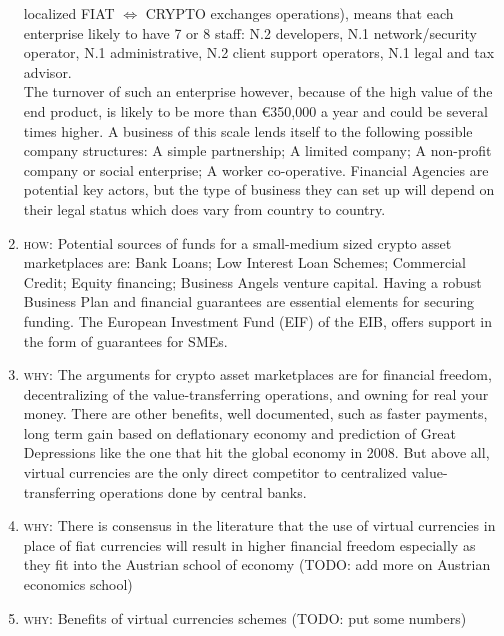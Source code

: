 \documentclass[11pt,fleqn,oneside]{book} %
\begin{document}
\begin{enumerate}
	localized FIAT $\Leftrightarrow$ CRYPTO exchanges operations), means that each enterprise likely to have 7 or 8 staff: N.2 developers, 
	N.1 network/security operator, N.1 administrative, N.2 client support operators, N.1 legal and tax advisor. \\
	The turnover of such an enterprise however, because of the high value of the end product, is likely to be more than 
	\euro 350,000 a year and could be several times higher. A business of
	this scale lends itself to the following possible company structures: A simple partnership;
	A limited company; A non-profit company or social enterprise; A worker co-operative.
	Financial Agencies are potential key actors, but the type of business they can set up will
	depend on their legal status which does vary from country to country.
	\item \textsc{how}: Potential sources of funds for a small-medium sized crypto asset marketplaces are: Bank Loans; Low
	Interest Loan Schemes; Commercial Credit; Equity financing; Business Angels venture
	capital. Having a robust Business Plan and financial guarantees are essential elements
	for securing funding. The European Investment Fund (EIF) of the EIB, offers support in
	the form of guarantees for SMEs.
	\item \textsc{why}: The arguments for crypto asset marketplaces are for financial freedom, decentralizing of the value-transferring operations, and
	owning for real your money. 
	There are other benefits, well documented, such as faster payments, long term gain based on deflationary economy and prediction of 
	Great Depressions like the one that hit the global economy in 2008. But
	above all, virtual currencies are the only direct competitor to centralized value-transferring operations done by central banks.

	\item \textsc{why}: There is consensus in the literature that the use of virtual currencies in place of fiat currencies will result in 
	higher financial freedom especially as they fit into the Austrian school of economy \cite{austrianTheory} 
	(TODO: add more on Austrian economics school)

	\item \textsc{why}: Benefits of virtual currencies schemes (TODO: put some numbers)


\end{enumerate}
\end{document}
